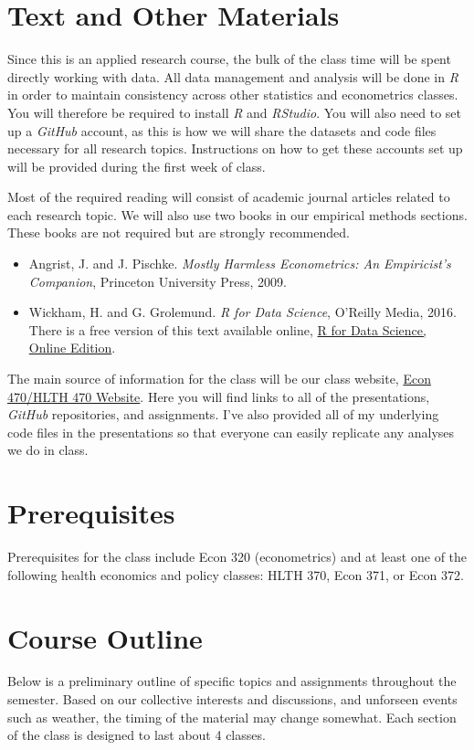 \documentclass{article}
\begin{document}
\section*{Text and Other Materials}
Since this is an applied research course, the bulk of the class time will be spent directly working with data. All data management and analysis will be done in \textit{R} in order to maintain consistency across other statistics and econometrics classes. You will therefore be required to install \textit{R} and \textit{RStudio}. You will also need to set up a \textit{GitHub} account, as this is how we will share the datasets and code files necessary for all research topics. Instructions on how to get these accounts set up will be provided during the first week of class.

Most of the required reading will consist of academic journal articles related to each research topic. We will also use two books in our empirical methods sections. These books are not required but are strongly recommended.
\begin{itemize}
 \item Angrist, J. and J. Pischke. \textit{Mostly Harmless Econometrics: An Empiricist's Companion}, Princeton University Press, 2009.
 \item Wickham, H. and G. Grolemund. \textit{R for Data Science}, O'Reilly Media, 2016. There is a free version of this text available online, \href{https://r4ds.had.co.nz/}{R for Data Science, Online Edition}.
\end{itemize}

The main source of information for the class will be our class website, \href{https://imccart.github.io/Econ-470/}{Econ 470/HLTH 470 Website}. Here you will find links to all of the presentations, \textit{GitHub} repositories, and assignments. I've also provided all of my underlying code files in the presentations so that everyone can easily replicate any analyses we do in class.

\section*{Prerequisites}
Prerequisites for the class include Econ 320 (econometrics) and at least one of the following health economics and policy classes: HLTH 370, Econ 371, or Econ 372.

\section*{Course Outline}
Below is a preliminary outline of specific topics and assignments throughout the semester. Based on our collective interests and discussions, and unforseen events such as weather, the timing of the material may change somewhat. Each section of the class is designed to last about 4 classes.
\end{document}
